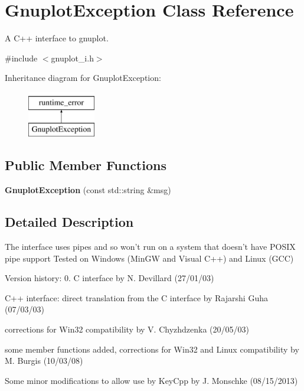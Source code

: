 \hypertarget{class_gnuplot_exception}{\section{Gnuplot\-Exception Class Reference}
\label{class_gnuplot_exception}
}


A C++ interface to gnuplot.  




{\ttfamily \#include $<$gnuplot\-\_\-i.\-h$>$}

Inheritance diagram for Gnuplot\-Exception\-:\begin{figure}[H]
\begin{center}
\leavevmode
\includegraphics[height=2.000000cm]{class_gnuplot_exception}
\end{center}
\end{figure}
\subsection*{Public Member Functions}
\begin{DoxyCompactItemize}
\item 
\hypertarget{class_gnuplot_exception_a8b324a9ef4d3f75079d41ecd61c62d44}{{\bfseries Gnuplot\-Exception} (const std\-::string \&msg)}\label{class_gnuplot_exception_a8b324a9ef4d3f75079d41ecd61c62d44}

\end{DoxyCompactItemize}


\subsection{Detailed Description}
The interface uses pipes and so won't run on a system that doesn't have P\-O\-S\-I\-X pipe support Tested on Windows (Min\-G\-W and Visual C++) and Linux (G\-C\-C)

Version history\-: 0. C interface by N. Devillard (27/01/03)
\begin{DoxyEnumerate}
\item C++ interface\-: direct translation from the C interface by Rajarshi Guha (07/03/03)
\item corrections for Win32 compatibility by V. Chyzhdzenka (20/05/03)
\item some member functions added, corrections for Win32 and Linux compatibility by M. Burgis (10/03/08)
\item Some minor modifications to allow use by Key\-Cpp by J. Monschke (08/15/2013)
\end{DoxyEnumerate}

